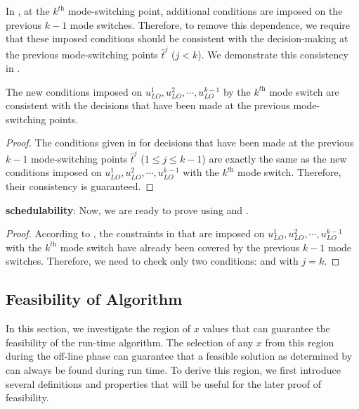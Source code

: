 \documentclass[10pt,journal,compsoc]{IEEEtran}
\begin{document}
In , at the $k^{\textit{th}}$ mode-switching point, additional conditions are imposed on the previous $k-1$ mode switches. Therefore, to remove this dependence, we require that these imposed conditions should be consistent with the decision-making at the previous mode-switching points $\hat{t}^j$ ($j<k$). We demonstrate this consistency in .   

\begin{theorem}
\label{thm:2}   
The new conditions imposed on $u_{LO}^{1},u_{LO}^{2},\cdots,u_{LO}^{k-1}$ by the $k^{\textit{th}}$ mode switch are consistent with the decisions that have been made at the previous mode-switching points.      
\end{theorem}
\begin{proof}
The conditions given in  for decisions that have been made at the previous $k-1$ mode-switching points $\hat{t}^{j}$ ($1\le{}j\le{k-1}$) are exactly the same as the new conditions imposed on $u_{LO}^{1},u_{LO}^{2},\cdots,u_{LO}^{k-1}$ with the $k^{\textit{th}}$ mode switch. Therefore, their consistency is guaranteed.     
\end{proof}

\noindent\textbf{\FMC schedulability}: Now, we are ready to prove  using  and .
 
\begin{proof}
According to , the constraints in  that are imposed on  $u_{LO}^{1},u_{LO}^{2},\cdots,u_{LO}^{k-1}$ with the $k^{\textit{th}}$ mode switch have already been covered by the previous $k-1$ mode switches. Therefore, we need to check only two conditions:  and  with $j=k$.
\end{proof}


\subsection{Feasibility of Algorithm}
\label{sec:fea}
In this section, we investigate the region of $x$ values that can guarantee the feasibility of the run-time algorithm. The selection of any $x$ from this region during the off-line phase can guarantee that a feasible solution as determined by  can always be found during run time. To derive this region, we first introduce several definitions and properties that will be useful for the later proof of feasibility. 
\end{document}
